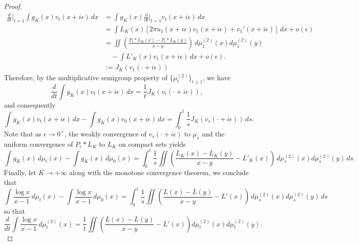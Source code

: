\documentclass[10pt, reqno]{amsart}
\numberwithin{equation}{section}
\theoremstyle{definition}
\theoremstyle{plain}
\theoremstyle{remark}
\newcommand{\1}{\mathbbm{1}}
\begin{document}
\begin{proof}
        \begin{align*}
            \frac{d}{d t}\Big|_{t=1} \int g_K(x)v_t(x+i\epsilon)\,dx
            &= \int g_K(x) \frac{\partial}{\partial t}\Big|_{t=1}v_t(x+i\epsilon)\,dx \\
            &= \int L_K(x)[2\pi u_1(x+i\epsilon)v_1(x+i\epsilon)+v_1'(x+i\epsilon)]\,dx +o(\epsilon) \\
            &= \iint\left(\frac{P_\epsilon\ast L_K(x)-P_\epsilon\ast L_K(y)}{x-y}\right)\,d\mu^{(2)}_1(x)d\mu^{(2)}_1(y)\\
            &\quad - \int L'_K(x)v_1(x+i\epsilon)\,dx + o(\epsilon).\\
            &:= J_K(v_1(\cdot+i\epsilon))
        \end{align*}
        Therefore, by the multiplicative semigroup property of $\{\mu^{(2)}_t\}_{t\ge 1}$, we have
        \begin{equation*}
            \frac{d}{d t} \int g_K(x)v_t(x+i\epsilon)\,dx = \frac{1}{t} J_K(v_t(\cdot+i\epsilon)),
        \end{equation*}
        and consequently
        \begin{equation*}
            \int g_K(x)v_t(x+i\epsilon)\,dx - \int g_K(x)v_0(x+i\epsilon)\,dx = \int_0^t \frac{1}{s}J_K(v_s(\cdot+i\epsilon))\,ds.
        \end{equation*}
        Note that as $\epsilon\to 0^+$, the weakly convergence of $v_s(\cdot+i\epsilon)$ to $\mu_s$ and the uniform convergence of $P_\epsilon\ast L_K$ to $L_K$ on compact sets yields
        \begin{equation*}
            \int g_K(x)\,d\mu_t(x) - \int g_K(x)\,d\mu_0(x) = \int_0^t \frac{1}{s}\iint\left(\frac{L_K(x)- L_K(y)}{x-y} - L'_K(x)\right)\,d\mu^{(2)}_s(x)d\mu^{(2)}_s(y)\,ds.
        \end{equation*}
        Finally, let $K\to +\infty$ along with the monotone convergence theorem, we conclude that
        \begin{equation*}
            \int \frac{\log x}{x-1}\,d\mu_t(x) - \int \frac{\log x}{x-1}\,d\mu_0(x) = \int_0^t \frac{1}{s}\iint\left(\frac{L(x)- L(y)}{x-y} - L'(x)\right)\,d\mu^{(2)}_s(x)d\mu^{(2)}_s(y)\,ds
        \end{equation*}
        so that
        \begin{equation}
            \frac{d}{d t} \int \frac{\log x}{x-1}\,d\mu^{(2)}_t(x) = \frac{1}{t}\iint\left(\frac{L(x)- L(y)}{x-y} - L'(x)\right)d\mu^{(2)}_t(x)d\mu^{(2)}_t(y).
        \end{equation}

\end{proof}
\end{document}

